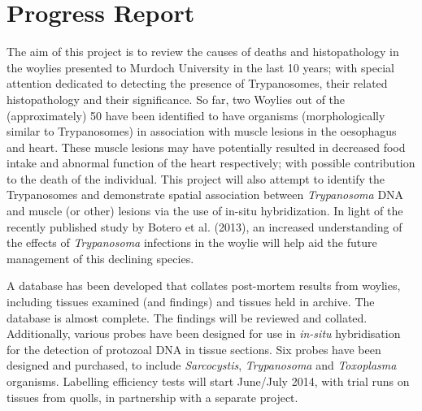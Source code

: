 \documentclass[version=last, paper=a4, DIV=18, usenames, dvipsnames]{scrartcl}
\begin{document}
%

%




\section*{Progress Report}
The aim of this project is to review the causes of deaths and
histopathology in the woylies presented to Murdoch University in the
last 10 years; with special attention dedicated to detecting the
presence of Trypanosomes, their related histopathology and their
significance. So far, two Woylies out of the (approximately) 50 have
been identified to have organisms (morphologically similar to
Trypanosomes) in association with muscle lesions in the oesophagus and
heart. These muscle lesions may have potentially resulted in decreased
food intake and abnormal function of the heart respectively; with
possible contribution to the death of the individual. This project will
also attempt to identify the Trypanosomes and demonstrate spatial
association between \emph{Trypanosoma} DNA and muscle (or other) lesions
via the use of in-situ hybridization. In light of the recently published
study by Botero et al. (2013), an increased understanding of the effects
of \emph{Trypanosoma} infections in the woylie will help aid the future
management of this declining species.

A database has been developed that collates post-mortem results from
woylies, including tissues examined (and findings) and tissues held in
archive. The database is almost complete. The findings will be reviewed
and collated. Additionally, various probes have been designed for use in
\emph{in-situ} hybridisation for the detection of protozoal DNA in
tissue sections. Six probes have been designed and purchased, to include
\emph{Sarcocystis}, \emph{Trypanosoma} and \emph{Toxoplasma} organisms.
Labelling efficiency tests will start June/July 2014, with trial runs on
tissues from quolls, in partnership with a separate project.




\clearpage
\end{document}
